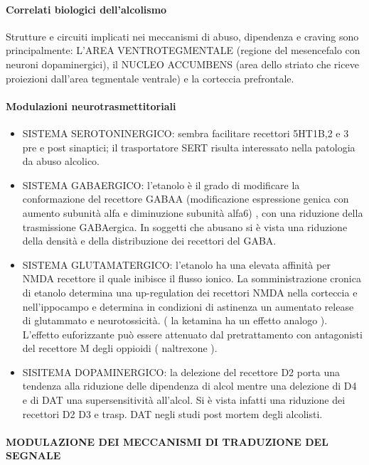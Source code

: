 \paragraph{Correlati biologici dell'alcolismo}

Strutture e circuiti implicati nei meccanismi di abuso, dipendenza e
craving sono principalmente: L'AREA VENTROTEGMENTALE (regione del
mesencefalo con neuroni dopaminergici), il NUCLEO ACCUMBENS (area dello
striato che riceve proiezioni dall'area tegmentale ventrale) e la
corteccia prefrontale.

\paragraph{Modulazioni neurotrasmettitoriali}

\begin{itemize}
\item SISTEMA SEROTONINERGICO: sembra facilitare recettori 5HT1B,2 e 3 pre e
post sinaptici; il trasportatore SERT risulta interessato nella
patologia da abuso alcolico.
\item SISTEMA GABAERGICO: l'etanolo è il grado di modificare la conformazione
del recettore GABAA (modificazione espressione genica con aumento
subunità alfa e diminuzione subunità alfa6) , con una riduzione della
trasmissione GABAergica. In soggetti che abusano si è vista una
riduzione della densità e della distribuzione dei recettori del GABA.
\item SISTEMA GLUTAMATERGICO: l'etanolo ha una elevata affinità per NMDA
recettore il quale inibisce il flusso ionico. La somministrazione
cronica di etanolo determina una up-regulation dei recettori NMDA nella
corteccia e nell'ippocampo e determina in condizioni di astinenza un
aumentato release di glutammato e neurotossicità. ( la ketamina ha un
effetto analogo ). L'effetto euforizzante può essere attenuato dal
pretrattamento con antagonisti del recettore M degli oppioidi (
naltrexone ).
\item SISITEMA DOPAMINERGICO: la delezione del recettore D2 porta una
tendenza alla riduzione delle dipendenza di alcol mentre una delezione
di D4 e di DAT una supersensitività all'alcol. Si è vista infatti una
riduzione dei recettori D2 D3 e trasp. DAT negli studi post mortem degli
alcolisti.
\end{itemize}

\paragraph{MODULAZIONE DEI MECCANISMI DI TRADUZIONE DEL SEGNALE}

